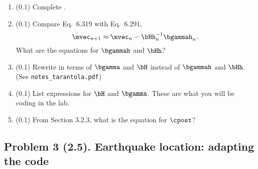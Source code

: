 \documentclass[11pt,titlepage,fleqn]{article}
\begin{document}
\begin{enumerate}
\begin{enumerate}
\vspace{1cm}

\item (0.1) Complete .

\item (0.1) Compare Eq.~6.319 with Eq.~6.291,
%
\begin{equation}
\mvec_{n+1} \approx \mvec_{n} - \bHh^{-1}_n \bgammah_n.
\label{mn}
\end{equation}
%
What are the equations for $\bgammah$ and $\bHh$?

\vspace{1cm}

\item (0.1) Rewrite  in terms of $\bgamma$ and $\bH$ instead of $\bgammah$ and $\bHh$. \\ (See \verb+notes_tarantola.pdf+)

\vspace{1cm}

\item (0.1) List expressions for $\bH$ and $\bgamma$. These are what you will be coding in the lab.

\vspace{1cm}

\item (0.1) From Section 3.2.3, what is the equation for $\cpost$?

\vspace{1cm}

\end{enumerate}

\end{enumerate}


\subsection*{Problem 3 (2.5). Earthquake location: adapting the code}

\end{document}

